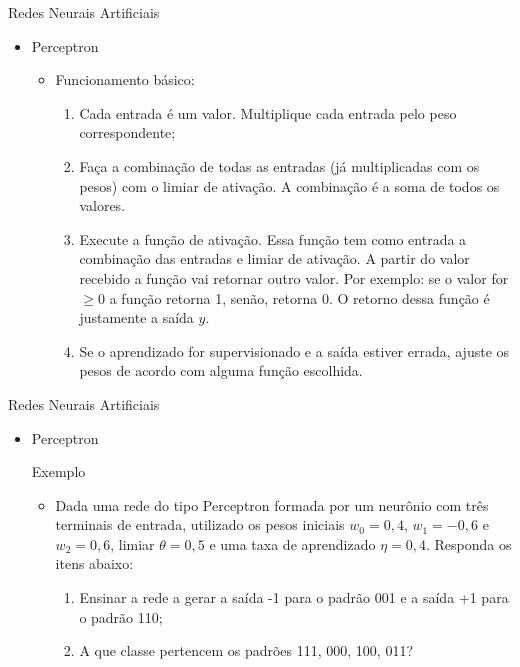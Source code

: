 \documentclass{libs/ufc_format}
\begin{document}
\begin{frame}{Redes Neurais Artificiais}
    \begin{itemize}
        \item Perceptron
            \begin{itemize}
                \item Funcionamento básico:
                    \begin{enumerate}
                        \justifying
                        \item<2-> Cada entrada é um valor. Multiplique cada entrada pelo peso correspondente;
                        \item<3-> Faça a combinação de todas as entradas (já multiplicadas com os pesos) com o limiar de ativação. A combinação é a soma de todos os valores.
                        \item<4-> Execute a função de ativação. Essa função tem como entrada a combinação das entradas e limiar de ativação. A partir do valor recebido a função vai retornar outro valor. Por exemplo: se o valor for $\ge 0$ a função retorna 1, senão, retorna 0. O retorno dessa função é justamente a saída $y$.
                        \item<5> Se o aprendizado for supervisionado e a saída estiver errada, ajuste os pesos de acordo com alguma função escolhida.
                    \end{enumerate}
            \end{itemize}
    \end{itemize}
\end{frame}

\begin{frame}{Redes Neurais Artificiais}
    \begin{itemize}
        \item Perceptron\\
        \begin{exampleblock}{Exemplo}
            \begin{itemize}
                \justifying
                \item Dada uma rede do tipo Perceptron formada por um neurônio com três terminais de entrada, utilizado os pesos iniciais $w_{0} = 0,4$, $w_{1} = -0,6$ e $w_{2} = 0,6$, limiar $\theta = 0,5$ e uma taxa de aprendizado $\eta = 0,4$. Responda os itens abaixo:
                    \begin{enumerate}
                        \justifying
                        \item Ensinar a rede a gerar a saída -1 para o padrão 001 e a saída +1 para o padrão 110;
                        \item A que classe pertencem os padrões 111, 000, 100, 011?
                    \end{enumerate}
            \end{itemize}
        \end{exampleblock}
    \end{itemize}
\end{frame}
\end{document}
